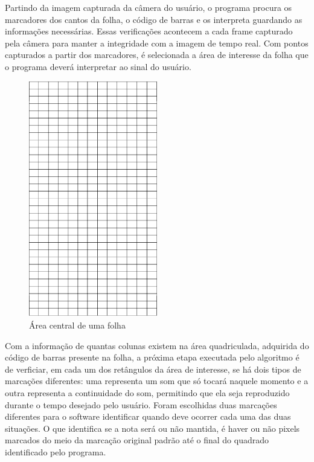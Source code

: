 \documentclass[12pt]{report}
\begin{document}
{Partindo da imagem capturada da câmera do usuário, o programa procura
os marcadores dos cantos da folha, o código de barras e os interpreta
guardando as informações necessárias. Essas verificações acontecem a
cada frame capturado pela câmera para manter a integridade com a
imagem de tempo real.  Com pontos capturados a partir dos marcadores,
é selecionada a área de interesse da folha que o programa deverá
interpretar ao sinal do usuário.

\begin{figure}[H]
  \centering
    \includegraphics[angle=90,origin=c,width=0.5\textwidth]{imagens/aoi.png}
    \caption{Área central de uma folha}
  \label{fig:aoi_aoi}
\end{figure}

Com a informação de quantas colunas existem na área quadriculada, adquirida do código de barras presente na folha, a próxima etapa executada pelo algoritmo é de verficiar, em cada um dos retângulos da área de interesse, se há dois tipos de marcações diferentes: uma representa um som que só tocará naquele momento e a outra representa a continuidade do som, permitindo que ela seja reproduzido durante o tempo desejado pelo usuário. Foram escolhidas duas marcações diferentes para o software identificar quando deve ocorrer cada uma das duas situações. O que identifica se a nota será ou não mantida, é haver ou não pixels marcados do meio da marcação original padrão até o final do quadrado identificado pelo programa.

}
\end{document}
